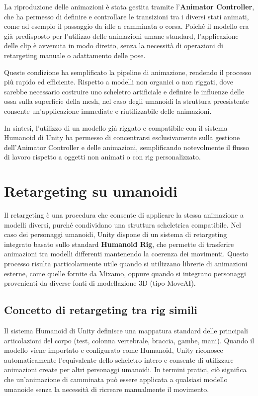 La riproduzione delle animazioni è stata gestita tramite l'\textbf{Animator Controller}, che ha permesso di definire e controllare le transizioni tra i diversi stati animati, come ad esempio il passaggio da idle a camminata o corsa. Poiché il modello era già predisposto per l'utilizzo delle animazioni umane standard, l'applicazione delle clip è avvenuta in modo diretto, senza la necessità di operazioni di retargeting manuale o adattamento delle pose.

Queste condizione ha semplificato la pipeline di animazione, rendendo il processo più rapido ed efficiente. Rispetto a modelli non organici o non riggati, dove sarebbe necessario costruire uno scheletro artificiale e definire le influenze delle ossa sulla superficie della mesh, nel caso degli umanoidi la struttura preesistente consente un'applicazione immediate e riutilizzabile delle animazioni.

In sintesi, l'utilizzo di un modello già riggato e compatibile con il sistema Humanoid di Unity ha permesso di concentrarsi esclusivamente sulla gestione dell'Animator Controller e delle animazioni, semplificando notevolmente il flusso di lavoro rispetto a oggetti non animati o con rig personalizzato.


\section{Retargeting su umanoidi}

Il retargeting è una procedura che consente di applicare la stessa animazione a modelli diversi, purché condividano una struttura scheletrica compatibile. Nel caso dei personaggi umanoidi, Unity dispone di un sistema di retargeting integrato basato sullo standard \textbf{Humanoid Rig}, che permette di trasferire animazioni tra modelli differenti mantenendo la coerenza dei movimenti. Questo processo risulta particolarmente utile quando si utilizzano librerie di animazioni esterne, come quelle fornite da Mixamo, oppure quando si integrano personaggi provenienti da diverse fonti di modellazione 3D (tipo MoveAI).  

\subsection{Concetto di retargeting tra rig simili}

Il sistema Humanoid di Unity definisce una mappatura standard delle principali articolazioni del corpo (test, colonna vertebrale, braccia, gambe, mani). Quando il modello viene importato e configurato come Humanoid, Unity riconosce automaticamente l'equivalente dello scheletro intero e consente di utilizzare animazioni create per altri personaggi umanoidi.
In termini pratici, ciò significa che un'animazione di camminata può essere applicata a qualsiasi modello umanoide senza la necessità di ricreare manualmente il movimento.


